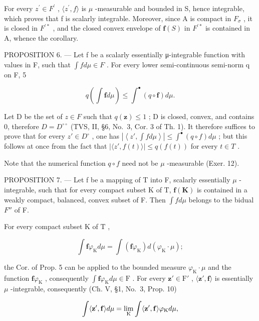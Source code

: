 For every \(z^{\prime} \in F^{\prime}\) , \(\langle z^{\prime}, f \rangle\) is \(\mu\) -measurable and bounded in S, hence integrable, which proves that f is scalarly integrable. Moreover, since A is compact in \(F_{\sigma}\) , it is closed in \(F^{\prime*}\) , and the closed convex envelope of \(\mathbf{f}(S)\) in \(F^{\prime*}\) is contained in A, whence the corollary.

PROPOSITION 6. --- Let f be a scalarly essentially μ-integrable function with values in F, such that \(\int f d\mu \in F\) . For every lower semi-continuous semi-norm q on F, 5

\[
q \left(\int \mathbf {f} d \mu\right) \leqslant \int^ {\bullet} (q \circ \mathbf {f}) d \mu .
\]

Let D be the set of \(z \in F\) such that \(q(\mathbf{z}) \leqslant 1\) ; D is closed, convex, and contains 0, therefore \(D = D^{\circ\circ}\) (TVS, II, §6, No.~3, Cor. 3 of Th. 1). It therefore suffices to prove that for every \(z' \in D^{\circ}\) , one has \(\left|\left\langle z', \int f d\mu \right\rangle\right| \leqslant \int^{\bullet}(q \circ f) d\mu\) ; but this follows at once from the fact that \(|\langle z', f(t) \rangle| \leqslant q(f(t))\) for every \(t \in T\) .

Note that the numerical function \(q \circ f\) need not be \(\mu\) -measurable (Exer. 12).

PROPOSITION 7. --- Let f be a mapping of T into F, scalarly essentially \(\mu\) -integrable, such that for every compact subset K of T, \(\mathbf{f}(\mathbf{K})\) is contained in a weakly compact, balanced, convex subset of F. Then \(\int f d\mu\) belongs to the bidual \(F''\) of F.

For every compact subset \(\mathrm{K}\) of \(\mathrm{T}\) ,

\[
\int \mathbf {f} \varphi_ {\mathrm{K}} d \mu = \int (\mathbf {f} \varphi_ {\mathrm{K}}) d (\varphi_ {\mathrm{K}} \cdot \mu);
\]

the Cor. of Prop. 5 can be applied to the bounded measure \(\varphi_{\mathrm{K}} \cdot \mu\) and the function \(\mathbf{f}\varphi_{\mathrm{K}}\) , consequently \(\int \mathbf{f}\varphi_{\mathrm{K}} d\mu \in \mathrm{F}\) . For every \(\mathbf{z}' \in \mathrm{F}'\) , \(\langle \mathbf{z}', \mathbf{f} \rangle\) is essentially \(\mu\) -integrable, consequently (Ch. V, §1, No.~3, Prop. 10)

\[
\int \langle {\bf z} ^ {\prime}, {\bf f} \rangle d \mu = \lim _ {\mathrm{K}} \int \langle {\bf z} ^ {\prime}, {\bf f} \rangle \varphi_ {\mathrm{K}} d \mu ,
\]

